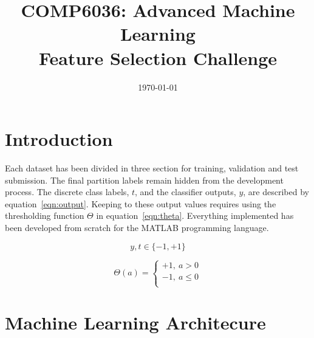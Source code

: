 \documentclass{ecsarticle}     %
\begin{document}
\frontmatter
\title      {COMP6036: Advanced Machine Learning\\
            Feature Selection Challenge}
      
\addresses  {\deptname\\\univname}

\date       {\today}
\subject    {}
\keywords   {}
\maketitle


\begin{abstract}
\end{abstract}

\mainmatter


\section{Introduction}

Each dataset has been divided in three section for training, validation and test submission.
The final partition labels remain hidden from the development process.
The discrete class labels, $t$, and the classifier outputs, $y$, are described by equation~\eqref{eqn:output}.
Keeping to these output values requires using the thresholding function $\Theta$ in equation~\eqref{eqn:theta}. 
Everything implemented has been developed from scratch for the MATLAB programming language. 


\begin{equation}
	y,t \in \{-1,+1\}
	\label{eqn:output}
\end{equation}

\begin{equation}
	\Theta(a) = \left\{ 
      \begin{array}{l}
         +1,\:a > 0\\
         -1,\:a \leq 0\\
      \end{array} \right.	
	\label{eqn:theta}
\end{equation}

\section{Machine Learning Architecure}
\end{document}
